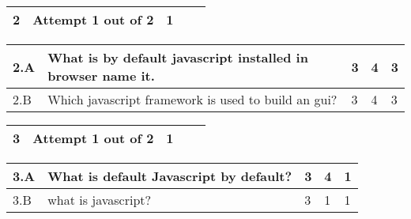 \documentclass[12pt]{article}
\begin{document}
	\begin{tabular}{L{1cm}L{9cm}C{2cm}C{2cm}C{1cm}}
	\bf2 & Attempt 1 out of 2 & 1  & & \\ \hline
\end{tabular}



\begin{tabular}{|L{1cm}|L{9cm}|C{2cm}|C{2cm}|C{1cm}|}
		2.A &
	What is by default javascript installed in browser name it. &  3 & 4 & 3\\ \hline
		2.B &
	Which javascript framework is used to build an gui? &  3 & 4 & 3\\ \hline
	\end{tabular}


\begin{tabular}{L{1cm}L{9cm}C{2cm}C{2cm}C{1cm}}
	\bf3 & Attempt 1 out of 2 & 1  & & \\ \hline
\end{tabular}



\begin{tabular}{|L{1cm}|L{9cm}|C{2cm}|C{2cm}|C{1cm}|}
		3.A &
	What is default Javascript by default? &  3 & 4 & 1\\ \hline
		3.B &
	what is javascript? &  3 & 1 & 1\\ \hline
	\end{tabular}
\end{document}
